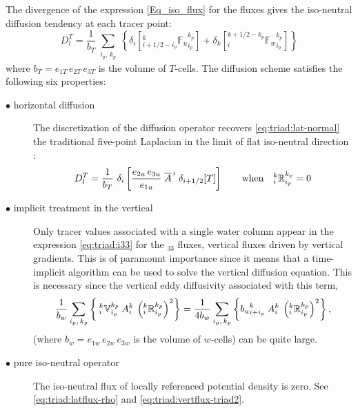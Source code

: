  The divergence of the expression \eqref{Eq_iso_flux} for the fluxes gives the iso-neutral diffusion tendency at
each tracer point:
\begin{equation} \label{eq:triad:iso_operator} D_l^T = \frac{1}{b_T}
  \sum_{\substack{i_p,\,k_p}} \left\{ \delta_{i} \left[{_{i+1/2-i_p}^k
        {\mathbb{F}_u }_{i_p}^{k_p}} \right] + \delta_{k} \left[
      {_i^{k+1/2-k_p} {\mathbb{F}_w}_{i_p}^{k_p}} \right] \right\}
\end{equation}
where $b_T= e_{1T}\,e_{2T}\,e_{3T}$ is the volume of $T$-cells.
The diffusion scheme satisfies the following six properties:
\begin{description}
\item[$\bullet$ horizontal diffusion] The discretization of the
  diffusion operator recovers \eqref{eq:triad:lat-normal} the traditional five-point Laplacian in
  the limit of flat iso-neutral direction :
  \begin{equation} \label{eq:triad:iso_property0} D_l^T = \frac{1}{b_T} \
    \delta_{i} \left[ \frac{e_{2u}\,e_{3u}}{e_{1u}} \;
      \overline{{A}}^{\,i} \; \delta_{i+1/2}[T] \right] \qquad
    \text{when} \quad { _i^k \mathbb{R}_{i_p}^{k_p} }=0
  \end{equation}

\item[$\bullet$ implicit treatment in the vertical] Only tracer values
  associated with a single water column appear in the expression
  \eqref{eq:triad:i33} for the $_{33}$ fluxes, vertical fluxes driven by
  vertical gradients. This is of paramount importance since it means
  that a time-implicit algorithm can be used to solve the vertical
  diffusion equation. This is necessary
 since the vertical eddy
  diffusivity associated with this term,
  \begin{equation}
    \frac{1}{b_w}\sum_{\substack{i_p, \,k_p}} \left\{
      {\:}_i^k\mathbb{V}_{i_p}^{k_p} \: {A}_i^k \: \left(_i^k \mathbb{R}_{i_p}^{k_p}\right)^2
    \right\}  =
    \frac{1}{4b_w}\sum_{\substack{i_p, \,k_p}} \left\{
      {b_u}_{i+i_p}^k\: {A}_i^k \: \left(_i^k \mathbb{R}_{i_p}^{k_p}\right)^2
    \right\},
 \end{equation}
  (where $b_w= e_{1w}\,e_{2w}\,e_{3w}$ is the volume of $w$-cells) can be quite large.

\item[$\bullet$ pure iso-neutral operator] The iso-neutral flux of
  locally referenced potential density is zero. See
  \eqref{eq:triad:latflux-rho} and \eqref{eq:triad:vertflux-triad2}.


\end{description}
